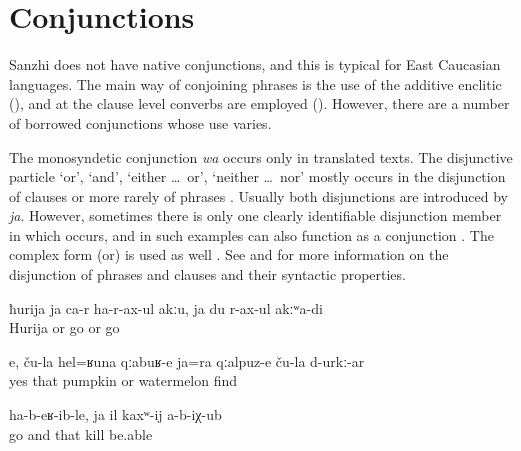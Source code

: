 
\section{Conjunctions}
\label{sec:Conjunctions}

Sanzhi does not have native conjunctions, and this is typical for East Caucasian languages. The main way of conjoining phrases is the use of the additive enclitic (), and at the clause level converbs are employed (). However, there are a number of borrowed conjunctions whose use varies.

The monosyndetic conjunction \textit{wa}  occurs only in translated texts. The disjunctive particle  `or', `and', `either \ldots\ or', `neither \ldots\ nor' mostly occurs in the disjunction of clauses  or more rarely of phrases . Usually both disjunctions are introduced by \textit{ja}. However, sometimes there is only one clearly identifiable disjunction member in which  occurs, and in such examples  can also function as a conjunction . The complex form  (or) is used as well . See  and  for more information on the disjunction of phrases and clauses and their syntactic properties.
%
\begin{exe}
	\ex	\label{ex:‎Neither Xurija herself comes nor do I go minor}
	\gll	ħurija	ja	ca-r	ha-r-ax-ul	akːu,	ja	du	r-ax-ul	akːʷa-di\\
		Hurija	or		go		or		go	\\
	\glt	{}

	\ex	\label{ex:‎These are probably their pumpkins or watermelons minor}
	\gll	e,	ču-la	hel=ʁuna	qːabuʁ-e	ja=ra	qːalpuz-e	ču-la	d-urkː-ar\\
		yes		that	pumpkin	or	watermelon		find\\
	\glt	{}

	\ex	\label{ex:They went and they could not kill him minor}
	\gll	ha-b-eʁ-ib-le,	ja	il	kaxʷ-ij	a-b-iχ-ub\\
		go	and	that	kill	be.able\\
	\glt	{}
\end{exe}

